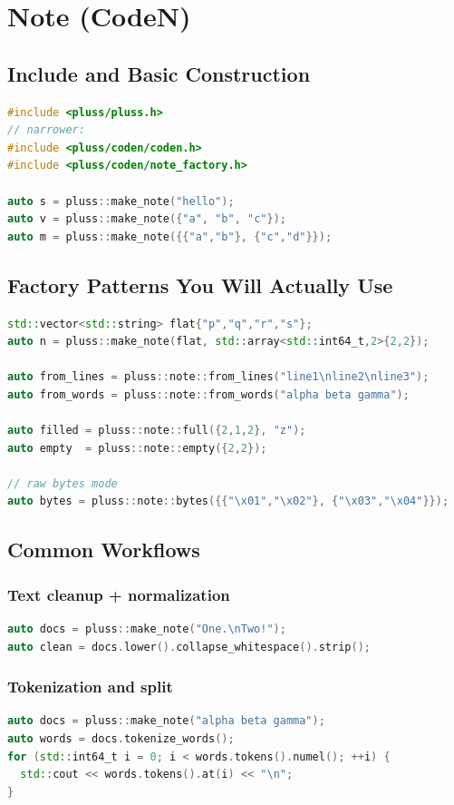 \documentclass[11pt]{article}
\begin{document}
\section{Note (CodeN)}
\subsection{Include and Basic Construction}
\begin{lstlisting}[language=C++]
#include <pluss/pluss.h>
// narrower:
#include <pluss/coden/coden.h>
#include <pluss/coden/note_factory.h>

auto s = pluss::make_note("hello");
auto v = pluss::make_note({"a", "b", "c"});
auto m = pluss::make_note({{"a","b"}, {"c","d"}});
\end{lstlisting}

\subsection{Factory Patterns You Will Actually Use}
\begin{lstlisting}[language=C++]
std::vector<std::string> flat{"p","q","r","s"};
auto n = pluss::make_note(flat, std::array<std::int64_t,2>{2,2});

auto from_lines = pluss::note::from_lines("line1\nline2\nline3");
auto from_words = pluss::note::from_words("alpha beta gamma");

auto filled = pluss::note::full({2,1,2}, "z");
auto empty  = pluss::note::empty({2,2});

// raw bytes mode
auto bytes = pluss::note::bytes({{"\x01","\x02"}, {"\x03","\x04"}});
\end{lstlisting}

\subsection{Common Workflows}
\subsubsection{Text cleanup + normalization}
\begin{lstlisting}[language=C++]
auto docs = pluss::make_note("One.\nTwo!");
auto clean = docs.lower().collapse_whitespace().strip();
\end{lstlisting}

\subsubsection{Tokenization and split}
\begin{lstlisting}[language=C++]
auto docs = pluss::make_note("alpha beta gamma");
auto words = docs.tokenize_words();
for (std::int64_t i = 0; i < words.tokens().numel(); ++i) {
  std::cout << words.tokens().at(i) << "\n";
}
\end{lstlisting}
\end{document}
